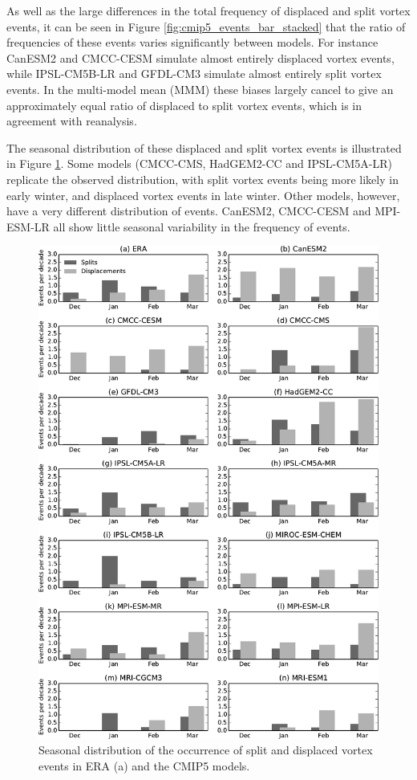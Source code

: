 As well as the large differences in the total frequency of displaced and split
vortex events, it can be seen in Figure \ref{fig:cmip5_events_bar_stacked} that
the ratio of frequencies of these events varies significantly between
models. For instance CanESM2 and CMCC-CESM simulate almost entirely displaced
vortex events, while IPSL-CM5B-LR and GFDL-CM3 simulate almost entirely split
vortex events. In the multi-model mean (MMM) these biases largely cancel to give
an approximately equal ratio of displaced to split vortex events, which is in
agreement with reanalysis.

The seasonal distribution of these displaced and split vortex events is
illustrated in Figure \ref{fig:cmip5_events_seasonal}. Some models (CMCC-CMS,
HadGEM2-CC and IPSL-CM5A-LR) replicate the observed distribution, with split
vortex events being more likely in early winter, and displaced vortex events in
late winter. Other models, however, have a very different
distribution of events. CanESM2, CMCC-CESM and MPI-ESM-LR all show little
seasonal variability in the frequency of events. 


\begin{figure}
 \centering
 \noindent\includegraphics[width=\textwidth]{figures/chapter-models/events_seasonal.pdf}
 \caption[Seasonal distribution of splits and displacements in the CMIP5
 models]{Seasonal distribution of the occurrence of split and displaced vortex
   events in ERA (a) and the CMIP5 models.}
 \label{fig:cmip5_events_seasonal}
\end{figure}

